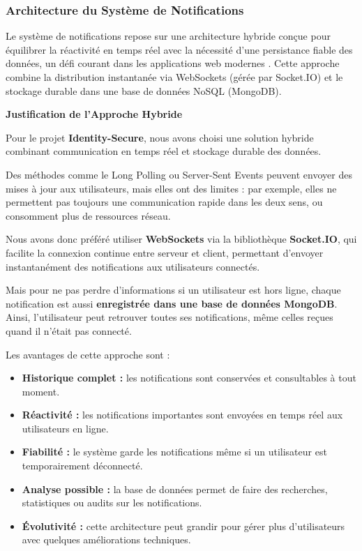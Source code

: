 \subsubsection{Architecture du Système de Notifications}
\label{subsec:sprint7_architecture}

Le système de notifications repose sur une architecture hybride conçue pour équilibrer la réactivité en temps réel avec la nécessité d'une persistance fiable des données, un défi courant dans les applications web modernes \cite{b42}. Cette approche combine la distribution instantanée via WebSockets (gérée par Socket.IO) et le stockage durable dans une base de données NoSQL (MongoDB).

\textbf{Justification de l’Approche Hybride}
\label{subsubsec:hybrid_justification_simple}

Pour le projet \textbf{Identity-Secure}, nous avons choisi une solution hybride combinant communication en temps réel et stockage durable des données.

Des méthodes comme le Long Polling ou Server-Sent Events peuvent envoyer des mises à jour aux utilisateurs, mais elles ont des limites : par exemple, elles ne permettent pas toujours une communication rapide dans les deux sens, ou consomment plus de ressources réseau.

Nous avons donc préféré utiliser \textbf{WebSockets} via la bibliothèque \textbf{Socket.IO}, qui facilite la connexion continue entre serveur et client, permettant d’envoyer instantanément des notifications aux utilisateurs connectés.

Mais pour ne pas perdre d’informations si un utilisateur est hors ligne, chaque notification est aussi \textbf{enregistrée dans une base de données MongoDB}. Ainsi, l’utilisateur peut retrouver toutes ses notifications, même celles reçues quand il n’était pas connecté.

Les avantages de cette approche sont :

\begin{itemize}
    \item \textbf{Historique complet :} les notifications sont conservées et consultables à tout moment.
    \item \textbf{Réactivité :} les notifications importantes sont envoyées en temps réel aux utilisateurs en ligne.
    \item \textbf{Fiabilité :} le système garde les notifications même si un utilisateur est temporairement déconnecté.
    \item \textbf{Analyse possible :} la base de données permet de faire des recherches, statistiques ou audits sur les notifications.
    \item \textbf{Évolutivité :} cette architecture peut grandir pour gérer plus d’utilisateurs avec quelques améliorations techniques.
\end{itemize}

